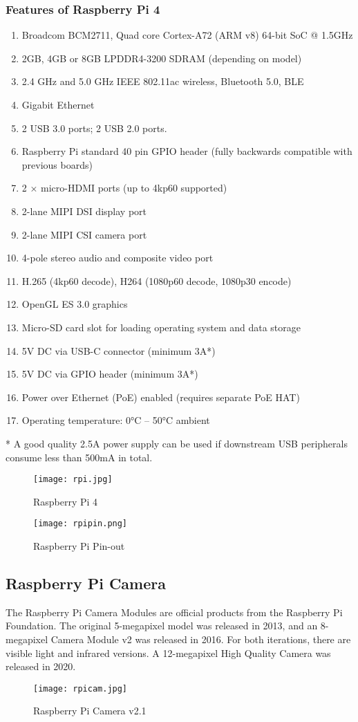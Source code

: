 \subsubsection*{Features of Raspberry Pi 4}
\begin{enumerate}
\item Broadcom BCM2711, Quad core Cortex-A72 (ARM v8) 64-bit SoC @ 1.5GHz
\item 2GB, 4GB or 8GB LPDDR4-3200 SDRAM (depending on model)
\item 2.4 GHz and 5.0 GHz IEEE 802.11ac wireless, Bluetooth 5.0, BLE
\item Gigabit Ethernet
\item 2 USB 3.0 ports; 2 USB 2.0 ports.
\item Raspberry Pi standard 40 pin GPIO header (fully backwards compatible with previous boards)
\item 2 × micro-HDMI ports (up to 4kp60 supported)
\item 2-lane MIPI DSI display port
\item 2-lane MIPI CSI camera port
\item 4-pole stereo audio and composite video port
\item H.265 (4kp60 decode), H264 (1080p60 decode, 1080p30 encode)
\item OpenGL ES 3.0 graphics
\item Micro-SD card slot for loading operating system and data storage
\item 5V DC via USB-C connector (minimum 3A*)
\item 5V DC via GPIO header (minimum 3A*)
\item Power over Ethernet (PoE) enabled (requires separate PoE HAT)
\item Operating temperature: \ang{0}C – \ang{50}C ambient
\end{enumerate}
* A good quality 2.5A power supply can be used if downstream USB peripherals consume less than 500mA in total.\\
\begin{figure}[h]
\centering
\texttt{[image: rpi.jpg]}
\caption{Raspberry Pi 4} \vspace{1cm}
\texttt{[image: rpipin.png]}
\caption{Raspberry Pi Pin-out}
\end{figure}
\subsection{Raspberry Pi Camera}
The Raspberry Pi Camera Modules are official products from the Raspberry Pi \\Foundation. The original 5-megapixel model was released in 2013, and an 8-megapixel Camera Module v2 was released in 2016. For both iterations, there are visible light and infrared versions. A 12-megapixel High Quality Camera was released in 2020.
\begin{figure}[h]
\centering
\texttt{[image: rpicam.jpg]}
\caption{Raspberry Pi Camera v2.1}
\end{figure}
